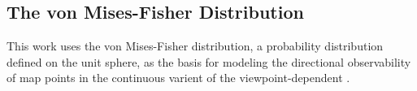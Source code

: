 \subsection{The von Mises-Fisher Distribution}

This work uses the von Mises-Fisher distribution, a probability distribution defined on the unit sphere, as the basis for modeling the directional observability of map points in the continuous varient of the viewpoint-dependent .